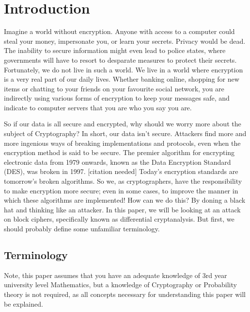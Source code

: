 



\chapter{Introduction} \label{c:introduction}
Imagine a world without encryption. Anyone with access to a computer could
steal your money, impersonate you, or learn your secrets.  Privacy would be
dead. The inability to secure information might even lead to police states,
where governments will have to resort to desparate measures to protect their
secrets.  Fortunately, we do not live in such a world. We live in a world where
encryption is a very real part of our daily lives. Whether banking online,
shopping for new items or chatting to your friends on your favourite social
network, you are indirectly using various forms of encryption to keep your
messages safe, and indicate to computer servers that you are who you say you
are.

So if our data is all secure and encrypted, why should we worry more about the
subject of Cryptography? In short, our data isn't secure. Attackers find more
and more ingenious ways of breaking implementations and protocols, even when
the encryption method is said to be secure. The premier algorithm for
encrypting electronic data from 1979 onwards, known as the Data Encryption
Standard (DES), was broken in 1997. [citation needed] Today's encryption
standards are tomorrow's broken algorithms. So we, as cryptographers, have the
responsibility to make encryption more secure; even in some cases, to improve
the manner in which these algorithms are implemented! How can we do this? By
doning a black hat and thinking like an attacker. In this paper, we will be
looking at an attack on block ciphers, specifically known as differential
cryptanalysis. But first, we should probably define some unfamiliar
terminology.

\section{Terminology}

\begin{rem}
Note, this paper assumes that you have an adequate knowledge of 3rd year
university level Mathematics, but a knowledge of Cryptography or Probability
theory is not required, as all concepts necessary for understanding this paper
will be explained.
\end{rem}

